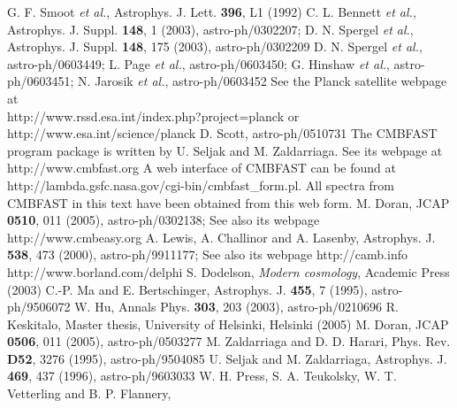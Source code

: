 \documentclass[twocolumn,nofootinbib,amsmath,amssymb]{revtex4}
\begin{document}
\begin{thebibliography}{10}

  G. F. Smoot \textit{et al.}, Astrophys. J. Lett. \textbf{396}, L1 (1992)
  C. L. Bennett \textit{et al.},
  Astrophys. J. Suppl. \textbf{148}, 1 (2003), astro-ph/0302207;
  D. N. Spergel \textit{et al.},
  Astrophys. J. Suppl. \textbf{148}, 175 (2003), astro-ph/0302209
  D. N. Spergel \textit{et al.}, astro-ph/0603449;
  L. Page \textit{et al.}, astro-ph/0603450;
  G. Hinshaw \textit{et al.}, astro-ph/0603451;
  N. Jarosik \textit{et al.}, astro-ph/0603452
  See the Planck satellite webpage at\\
  http://www.rssd.esa.int/index.php?project=planck or
  http://www.esa.int/science/planck
   D. Scott, astro-ph/0510731
  The CMBFAST program package is written by U. Seljak and M. Zaldarriaga. See
  its webpage at\\
  http://www.cmbfast.org
  A web interface of CMBFAST can be found at\\
  http://lambda.gsfc.nasa.gov/cgi-bin/cmbfast\_form.pl. All spectra from
  CMBFAST in this text have been obtained from this web form.
  M. Doran, JCAP \textbf{0510}, 011 (2005), astro-ph/0302138;
  See also its webpage http://www.cmbeasy.org
  A. Lewis, A. Challinor and A. Lasenby,
  Astrophys. J. \textbf{538}, 473 (2000), astro-ph/9911177;
  See also its webpage http://camb.info
  http://www.borland.com/delphi
  S. Dodelson, \textit{Modern cosmology}, Academic Press (2003)
  C.-P. Ma and E. Bertschinger, Astrophys. J. \textbf{455}, 7 (1995),
  astro-ph/9506072
  W. Hu, Annals Phys. \textbf{303}, 203 (2003), astro-ph/0210696
  R. Keskitalo, Master thesis, University of Helsinki, Helsinki (2005)
  M. Doran, JCAP \textbf{0506}, 011 (2005), astro-ph/0503277
  M. Zaldarriaga and D. D. Harari,
  Phys. Rev. \textbf{D52}, 3276 (1995), astro-ph/9504085
  U. Seljak and M. Zaldarriaga, Astrophys. J. \textbf{469}, 437 (1996),
  astro-ph/9603033
  W. H. Press, S. A. Teukolsky, W. T. Vetterling and B. P. Flannery,

\end{thebibliography}
\end{document}
